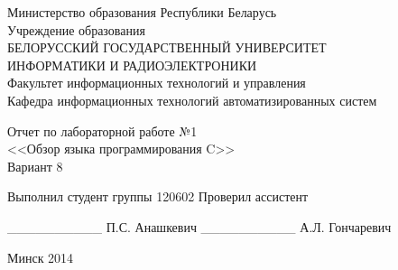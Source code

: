 
\thispagestyle{empty}
\setlength{\parindent}{0ex} %

\begin{center}
  Министерство образования Республики Беларусь \\
  \smallskip
  Учреждение образования \\
  БЕЛОРУССКИЙ ГОСУДАРСТВЕННЫЙ УНИВЕРСИТЕТ \\
  ИНФОРМАТИКИ И РАДИОЭЛЕКТРОНИКИ \\
  \smallskip
  Факультет информационных технологий и управления \\
  \smallskip
  Кафедра информационных технологий автоматизированных систем
\end{center}

\vspace{50mm}

\begin{center}
  Отчет по лабораторной работе №1 \\
  <<Обзор языка программирования C>> \\
  Вариант 8
\end{center}

\vspace{45mm}

\begin{minipage}{.55\linewidth}
  Выполнил студент группы 120602
  \smallskip
  Проверил ассистент
\end{minipage}
\hfill
\begin{minipage}{.4\linewidth}
  \begin{flushright}
    \_\_\_\_\_\_\_\_\_\_ П.С. Анашкевич
    \smallskip
    \_\_\_\_\_\_\_\_\_\_ А.Л. Гончаревич
  \end{flushright}
\end{minipage}

\vspace{60mm}
\begin{center}
  Минск 2014
\end{center}

\setlength{\parindent}{5ex} %